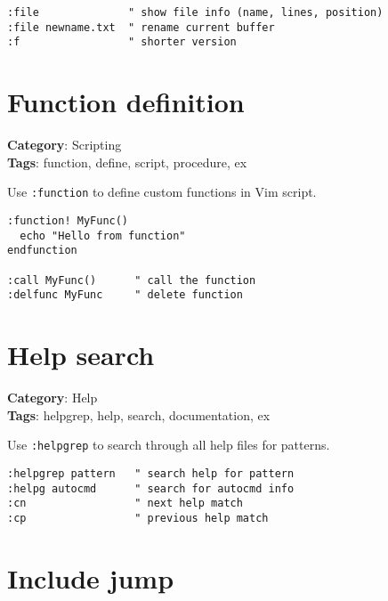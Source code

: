 {{{{{\begin{Exa*}{}
\begin{Verbatim}[fontsize=\footnotesize, breaklines, breakanywhere]
:file              " show file info (name, lines, position)
:file newname.txt  " rename current buffer
:f                 " shorter version
\end{Verbatim}
\end{Exa*}

\section{Function definition}

\textbf{Category}: Scripting\\ \textbf{Tags}: function, define, script, procedure, ex
\vspace{0.5cm}

Use {\footnotesize \Verb§:function§} to define custom functions in Vim script.

\begin{Exa*}{}
\begin{Verbatim}[fontsize=\footnotesize, breaklines, breakanywhere]
:function! MyFunc()
  echo "Hello from function"
endfunction

:call MyFunc()      " call the function
:delfunc MyFunc     " delete function
\end{Verbatim}
\end{Exa*}

\section{Help search}

\textbf{Category}: Help\\ \textbf{Tags}: helpgrep, help, search, documentation, ex
\vspace{0.5cm}

Use {\footnotesize \Verb§:helpgrep§} to search through all help files for patterns.

\begin{Exa*}{}
\begin{Verbatim}[fontsize=\footnotesize, breaklines, breakanywhere]
:helpgrep pattern   " search help for pattern
:helpg autocmd      " search for autocmd info
:cn                 " next help match
:cp                 " previous help match
\end{Verbatim}
\end{Exa*}

\section{Include jump}

}}}}}
